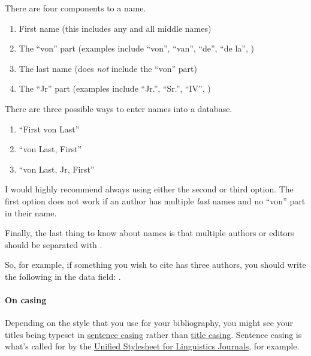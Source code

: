 There are four components to a name.

\begin{enumerate}[label={(\roman*)}]

	\item{First name (this includes any and all middle names)}

	\item{The ``von'' part (examples include ``von'', ``van'', ``de'', ``de la'', \ETC)}

	\item{The last name (does \emph{not} include the ``von'' part)}

	\item{The ``Jr'' part (examples include ``Jr.'', ``Sr.'', ``IV'', \ETC)}

\end{enumerate}

There are three possible ways to enter names into a  database.

\begin{enumerate}[label={(\roman*)}]

	\item{``First von Last''}

	\item{``von Last, First''}

	\item{``von Last, Jr, First''}

\end{enumerate}

I would highly recommend always using either the second or third option.
The first option does not work if an author has multiple \emph{last} names and no ``von'' part in their name.

Finally, the last thing to know about names is that multiple authors or editors should be separated with .

So, for example, if something you wish to cite has three authors, you should write the following in the  data field: .

\paragraph{On casing}

Depending on the style that you use for your bibliography, you might see your titles being typeset in \href{https://en.wiktionary.org/wiki/sentence_case}{sentence casing} rather than \href{https://en.wiktionary.org/wiki/title_case}{title casing}.
Sentence casing is what's called for by the \href{http://celxj.org/downloads/UnifiedStyleSheet.pdf}{Unified Stylesheet for Linguistics Journals}, for example.

